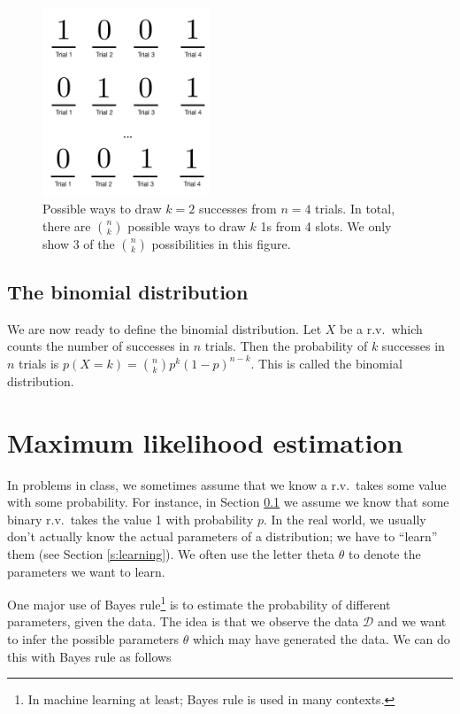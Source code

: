 \documentclass[]{article}
\theoremstyle{definition}
\begin{document}
\begin{figure}[!ht]
     \centering
     \includegraphics[width=5cm]{binomial_slots.pdf}
     \caption{Possible ways to draw $k=2$ successes from $n=4$ trials. In total, there are $n \choose k$ possible ways to draw $k$ 1s from 4 slots. We only show 3 of the $n \choose k$ possibilities in this figure.}\label{f:binomial_slots}
\end{figure}

\subsection{The binomial distribution}\label{s:binomial}

We are now ready to define the binomial distribution. Let $X$ be a r.v.\ which counts the number of successes in $n$ trials. Then the probability of $k$ successes in $n$ trials is $ p(X=k) = {n \choose k} p^k (1-p)^{n-k}$. This is called the binomial distribution.

\section{Maximum likelihood estimation} 

In problems in class, we sometimes assume that we know a r.v.\ takes some value with some probability. For instance, in Section \ref{s:binomial} we assume we know that some binary r.v.\ takes the value 1 with probability $p$. In the real world, we usually don't actually know the actual parameters of a distribution; we have to ``learn'' them (see Section \ref{s:learning}). We often use the letter theta $\theta$ to denote the parameters we want to learn. 

One major use of Bayes rule\footnote{In machine learning at least; Bayes rule is used in many contexts.} is to estimate the probability of different parameters, given the data. The idea is that we observe the data $\mathcal{D}$ and we want to infer the possible parameters $ \theta$ which may have generated the data. We can do this with Bayes rule as follows
\end{document}
